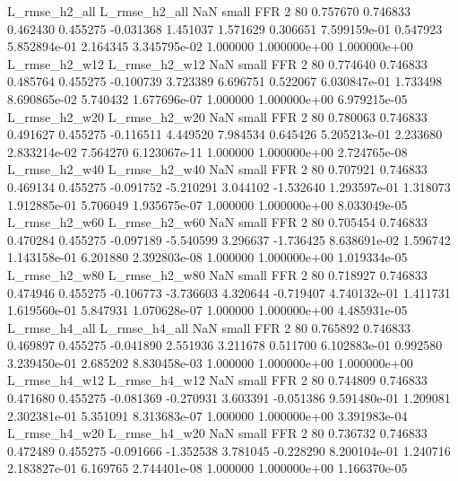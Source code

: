  L_rmse_h2_all  L_rmse_h2_all                   NaN      small      FFR                 2 80 0.757670       0.746833 0.462430       0.455275   -0.031368      1.451037      1.571629     0.306651   7.599159e-01  0.547923 5.852894e-01     2.164345   3.345795e-02            1.000000    1.000000e+00        1.000000e+00
 L_rmse_h2_w12  L_rmse_h2_w12                   NaN      small      FFR                 2 80 0.774640       0.746833 0.485764       0.455275   -0.100739      3.723389      6.696751     0.522067   6.030847e-01  1.733498 8.690865e-02     5.740432   1.677696e-07            1.000000    1.000000e+00        6.979215e-05
 L_rmse_h2_w20  L_rmse_h2_w20                   NaN      small      FFR                 2 80 0.780063       0.746833 0.491627       0.455275   -0.116511      4.449520      7.984534     0.645426   5.205213e-01  2.233680 2.833214e-02     7.564270   6.123067e-11            1.000000    1.000000e+00        2.724765e-08
 L_rmse_h2_w40  L_rmse_h2_w40                   NaN      small      FFR                 2 80 0.707921       0.746833 0.469134       0.455275   -0.091752     -5.210291      3.044102    -1.532640   1.293597e-01  1.318073 1.912885e-01     5.706049   1.935675e-07            1.000000    1.000000e+00        8.033049e-05
 L_rmse_h2_w60  L_rmse_h2_w60                   NaN      small      FFR                 2 80 0.705454       0.746833 0.470284       0.455275   -0.097189     -5.540599      3.296637    -1.736425   8.638691e-02  1.596742 1.143158e-01     6.201880   2.392803e-08            1.000000    1.000000e+00        1.019334e-05
 L_rmse_h2_w80  L_rmse_h2_w80                   NaN      small      FFR                 2 80 0.718927       0.746833 0.474946       0.455275   -0.106773     -3.736603      4.320644    -0.719407   4.740132e-01  1.411731 1.619560e-01     5.847931   1.070628e-07            1.000000    1.000000e+00        4.485931e-05
 L_rmse_h4_all  L_rmse_h4_all                   NaN      small      FFR                 2 80 0.765892       0.746833 0.469897       0.455275   -0.041890      2.551936      3.211678     0.511700   6.102883e-01  0.992580 3.239450e-01     2.685202   8.830458e-03            1.000000    1.000000e+00        1.000000e+00
 L_rmse_h4_w12  L_rmse_h4_w12                   NaN      small      FFR                 2 80 0.744809       0.746833 0.471680       0.455275   -0.081369     -0.270931      3.603391    -0.051386   9.591480e-01  1.209081 2.302381e-01     5.351091   8.313683e-07            1.000000    1.000000e+00        3.391983e-04
 L_rmse_h4_w20  L_rmse_h4_w20                   NaN      small      FFR                 2 80 0.736732       0.746833 0.472489       0.455275   -0.091666     -1.352538      3.781045    -0.228290   8.200104e-01  1.240716 2.183827e-01     6.169765   2.744401e-08            1.000000    1.000000e+00        1.166370e-05
